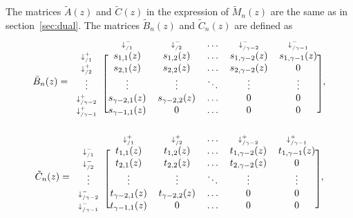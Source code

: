 \documentclass{article}
\begin{document}
\pagebreak

The matrices $\tilde{A}(z)$ and $\tilde{C}(z)$ in the expression of
$\tilde{M}_n(z)$ are the same as in section~\ref{sec:dual}. The matrices
$\tilde{B}_n(z)$ and $\tilde{C}_n(z)$ are defined as
\begin{equation*}
\tilde{B}_n(z) = 
\begin{blockarray}{cccccc}
   & \scriptstyle{\downarrow_{/1}^-} & \scriptstyle{\downarrow_{/2}^-} &
   \ldots & \scriptstyle{\downarrow_{/\gamma-2}^-} &
   \scriptstyle{\downarrow_{/\gamma-1}^-} \\
\begin{block}{c[ccccc]}
\scriptstyle{\downarrow_{/1}^+} & s_{1,1}(z) & s_{1,2}(z) &
    \ldots & s_{1,\gamma-2}(z) & s_{1,\gamma-1}(z) \\
\scriptstyle{\downarrow_{/2}^+} & s_{2,1}(z) & s_{2,2}(z) &
    \ldots & s_{2,\gamma-2}(z) & 0 \\
\vdots & \vdots & \vdots & \ddots & \vdots & \vdots \\
\scriptstyle{\downarrow_{/\gamma-2}^+} & s_{\gamma-2,1}(z) &
    s_{\gamma-2,2}(z) & \ldots & 0 & 0 \\
\scriptstyle{\downarrow_{/\gamma-1}^+} & s_{\gamma-1,1}(z) & 0 &
    \ldots & 0 & 0 \\
\end{block}
\end{blockarray},
\end{equation*}
\begin{equation*}
\tilde{C}_n(z) = 
\begin{blockarray}{cccccc}
   & \scriptstyle{\downarrow_{/1}^+} & \scriptstyle{\downarrow_{/2}^+} &
    \ldots & \scriptstyle{\downarrow_{/\gamma-2}^+} &
    \scriptstyle{\downarrow_{/\gamma-1}^+} \\
\begin{block}{c[ccccc]}
\scriptstyle{\downarrow_{/1}^-} & t_{1,1}(z) & t_{1,2}(z) &
    \ldots & t_{1,\gamma-2}(z) & t_{1,\gamma-1}(z) \\
\scriptstyle{\downarrow_{/2}^-} & t_{2,1}(z) & t_{2,2}(z) &
    \ldots & t_{2,\gamma-2}(z) & 0 \\
\vdots & \vdots & \vdots & \ddots & \vdots & \vdots \\
\scriptstyle{\downarrow_{/\gamma-2}^-} & t_{\gamma-2,1}(z) &
    t_{\gamma-2,2}(z) & \ldots & 0 & 0 \\
\scriptstyle{\downarrow_{/\gamma-1}^-} & t_{\gamma-1,1}(z) &
    0 & \ldots & 0 & 0 \\
\end{block}
\end{blockarray},
\end{equation*}
\end{document}
